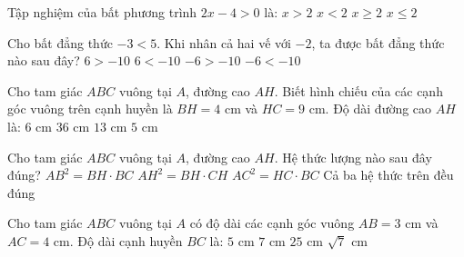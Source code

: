 \documentclass[12pt,a4paper]{article}
\begin{document}
\begin{ex}
Tập nghiệm của bất phương trình $2x - 4 > 0$ là:
\choice
{\True $x > 2$}
{$x < 2$}
{$x \ge 2$}
{$x \le 2$}
\end{ex}

\begin{ex}
Cho bất đẳng thức $-3 < 5$. Khi nhân cả hai vế với $-2$, ta được bất đẳng thức nào sau đây?
\choice
{\True $6 > -10$}
{$6 < -10$}
{$-6 > -10$}
{$-6 < -10$}
\end{ex}

\begin{ex}
Cho tam giác $ABC$ vuông tại $A$, đường cao $AH$. Biết hình chiếu của các cạnh góc vuông trên cạnh huyền là $BH = 4\text{ cm}$ và $HC = 9\text{ cm}$. Độ dài đường cao $AH$ là:
\choice
{\True $6\text{ cm}$}
{$36\text{ cm}$}
{$13\text{ cm}$}
{$5\text{ cm}$}
\end{ex}

\begin{ex}
Cho tam giác $ABC$ vuông tại $A$, đường cao $AH$. Hệ thức lượng nào sau đây đúng?
\choice
{$AB^2 = BH \cdot BC$}
{$AH^2 = BH \cdot CH$}
{$AC^2 = HC \cdot BC$}
{\True Cả ba hệ thức trên đều đúng}
\end{ex}

\begin{ex}
Cho tam giác $ABC$ vuông tại $A$ có độ dài các cạnh góc vuông $AB = 3\text{ cm}$ và $AC = 4\text{ cm}$. Độ dài cạnh huyền $BC$ là:
\choice
{\True $5\text{ cm}$}
{$7\text{ cm}$}
{$25\text{ cm}$}
{$\sqrt{7}\text{ cm}$}
\end{ex}
\end{document}
